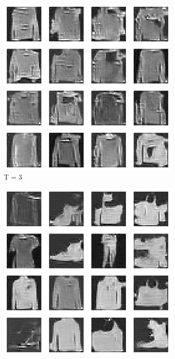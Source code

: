\documentclass{article}
\begin{document}
\begin{figure}[H]
	\begin{subfigure}[h]{0.3\linewidth}
		\centering
		\includegraphics[scale=0.3]{../code/generated_DDGAN_h2_3.png}
		\caption{T = 3}
	\end{subfigure}
	\hfill
	\begin{subfigure}[h]{0.3\linewidth}
		\centering
		\includegraphics[scale=0.3]{../code/generated_DDGAN_h2_5.png}

\end{subfigure}
\end{figure}
\end{document}
